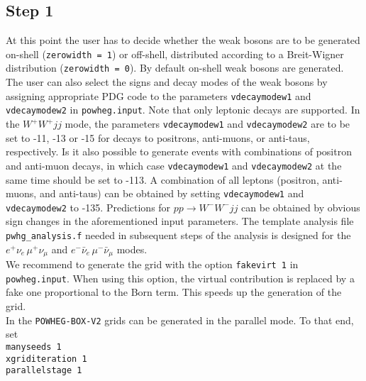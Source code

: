 \documentclass[a4paper,11pt]{article}
\newcommand\POWHEGBOX{{\tt POWHEG BOX}}
\newcommand\POWHEGBOXV{{\tt POWHEG-BOX-V2}}
\begin{document}
\subsection*{Step 1}
%
At this point the user
has to decide whether the weak bosons are to be generated on-shell
({\tt zerowidth = 1}) or off-shell, distributed according to a
Breit-Wigner distribution ({\tt zerowidth = 0}).  By default on-shell
weak bosons are generated. The user can also select the signs and decay modes of
the weak bosons by assigning appropriate PDG code to the parameters
{\tt vdecaymodew1} and {\tt vdecaymodew2} in {\tt powheg.input}. Note
that only leptonic decays are supported. 
%
In the $W^+W^+ jj$ mode, 
the parameters {\tt vdecaymodew1} and {\tt vdecaymodew2} are to be set to -11, -13 or -15  for decays to
positrons, anti-muons, or anti-taus, respectively. Is it also
possible to generate events with combinations of positron and anti-muon
decays, in which case {\tt vdecaymodew1} and {\tt vdecaymodew2} at the same time should
be set to -113. A combination of all leptons (positron, anti-muons, and 
anti-taus) can be obtained by setting {\tt vdecaymodew1} and {\tt vdecaymodew2}
to -135.
%
Predictions for $pp\to W^-W^-jj$ can be obtained by obvious sign changes in the aforementioned input parameters. 
%
The template analysis file
{\tt pwhg\_analysis.f} needed in subsequent steps of the analysis is
designed for the $e^+\nu_e \,\mu^+\nu_{\mu}$ and  $e^-\bar\nu_e \,\mu^-\bar\nu_{\mu}$ modes.
%
%
\\[2ex]
%
We recommend to generate the grid with the option {\tt fakevirt 1} in
{\tt powheg.input}. When using this option, the virtual contribution
is replaced by a fake one proportional to the Born term. This speeds
up the generation of the grid.
\\[2ex]
In the \POWHEGBOXV{} grids can be generated in the parallel mode. To that end, set
\\[2ex]
{\tt manyseeds   1}
\\
{\tt xgriditeration   1}
\\
{\tt parallelstage     1}
\\[2ex]
\end{document}
